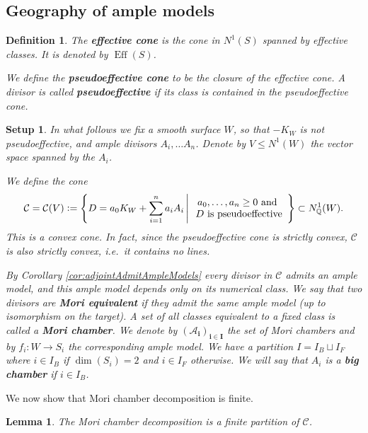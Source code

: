 \documentclass[a4paper,11pt]{amsart}
\newtheorem{lemma}[theorem]{Lemma}
\newtheorem{definition}[theorem]{Definition}
\newtheorem{setup}[theorem]{Setup}
\def\dim{\operatorname{dim}}
\def\Eff{\operatorname{Eff}}
\newcommand{\Cc}{\mathcal{C}}
\newcommand{\Aa}{\mathcal{A}}
\newcommand{\QQ}{\mathbb{Q}}
\newcommand{\defeq}{\vcentcolon=}
\begin{document}
\subsection{Geography of ample models}

\begin{definition}\label{def:pseff}
	The \textbf{effective cone} is the cone in $N^1(S)$ spanned by effective classes.
	It is denoted by $\Eff(S)$.
	
	We define the \textbf{pseudoeffective cone} to be the closure of the effective cone.
	A divisor is called \textbf{pseudoeffective} if its class is contained in the pseudoeffective cone.
\end{definition}


\begin{setup}\label{set:cone}
	In what follows we fix a smooth surface $W$, so that $-K_W$ is not pseudoeffective, and ample divisors $A_i, \dots A_n$.
	Denote by $V \leq N^1(W)$ the vector space spanned by the $A_i$.
	
	We define the cone
	\[
	\Cc = \Cc(V) \defeq \left\{D = a_0K_W + \sum_{i=1}^{n}a_iA_i \,\middle| \,
	\begin{array}{c}
		a_0, \dots, a_n \geq 0 \text{ and }\\
		D \text{ is pseudoeffective}
	\end{array}
	\right\} \subset N^1_{\QQ}(W).
	\]
	This is a convex cone.
	In fact, since the pseudoeffective cone is strictly convex, $\Cc$ is also strictly convex, i.e.\ it contains no lines.
	
	By Corollary \ref{cor:adjointAdmitAmpleModels} every divisor in $\Cc$ admits an ample model, and this ample model depends only on its numerical class.
	We say that two divisors are \textbf{Mori equivalent} if they admit the \emph{same} ample model (up to isomorphism on the target).
	A set of all classes equivalent to a fixed class is called a \textbf{Mori chamber}.
	We denote by $\mathbf{(\Aa_i)_{i\in I}}$ the set of Mori chambers and by $f_i\colon W \to S_i$ the corresponding ample model.
	We have a partition $I = I_B \sqcup I_F$ where $i \in I_B$ if $\dim(S_i)= 2$ and $i \in I_F$ otherwise.
	We will say that $A_i$ is a \textbf{big chamber} if $i \in I_B$.
\end{setup}


We now show that Mori chamber decomposition is finite.

\begin{lemma}\label{lem:decompFinite}
	The Mori chamber decomposition is a finite partition of $\Cc$.
\end{lemma}
\end{document}
